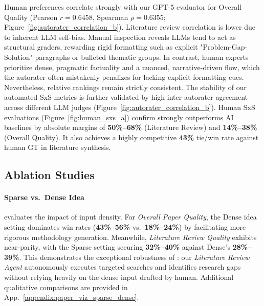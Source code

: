 Human preferences correlate strongly with our GPT-5 evaluator for Overall Quality (Pearson $r=0.6458$, Spearman $\rho=0.6355$; Figure~\ref{fig:autorater_correlation_b}). Literature review correlation is lower due to inherent LLM self-bias. Manual inspection reveals LLMs tend to act as structural graders, rewarding rigid formatting such as explicit "Problem-Gap-Solution" paragraphs or bulleted thematic groups. In contrast, human experts prioritize dense, pragmatic factuality and a nuanced, narrative-driven flow, which the autorater often mistakenly penalizes for lacking explicit formatting cues. Nevertheless, relative rankings remain strictly consistent. The stability of our automated SxS metrics is further validated by high inter-autorater agreement across different LLM judges (Figure~\ref{fig:autorater_correlation_b}). Human SxS evaluations (Figure~\ref{fig:human_sxs_a}) confirm \ourmethod{} strongly outperforms AI baselines by absolute margins of \textbf{50\%--68\%} (Literature Review) and \textbf{14\%--38\%} (Overall Quality). It also achieves a highly competitive \textbf{43\%} tie/win rate against human GT in literature synthesis. 


\subsection{Ablation Studies}




\paragraph{Sparse vs.\ Dense Idea}
 evaluates the impact of input density. For \textit{Overall Paper Quality}, the Dense idea setting dominates win rates (\textbf{43\%--56\%} vs.\ \textbf{18\%--24\%}) by facilitating more rigorous methodology generation. Meanwhile, \textit{Literature Review Quality} exhibits near-parity, with the Sparse setting securing \textbf{32\%--40\%} against Dense's \textbf{28\%--39\%}. This demonstrates the exceptional robustness of \ourmethod: our \textit{Literature Review Agent} autonomously executes targeted searches and identifies research gaps without relying heavily on the dense input drafted by human. Additional qualitative comparisons are provided in App.~\ref{appendix:paper_viz_sparse_dense}.

